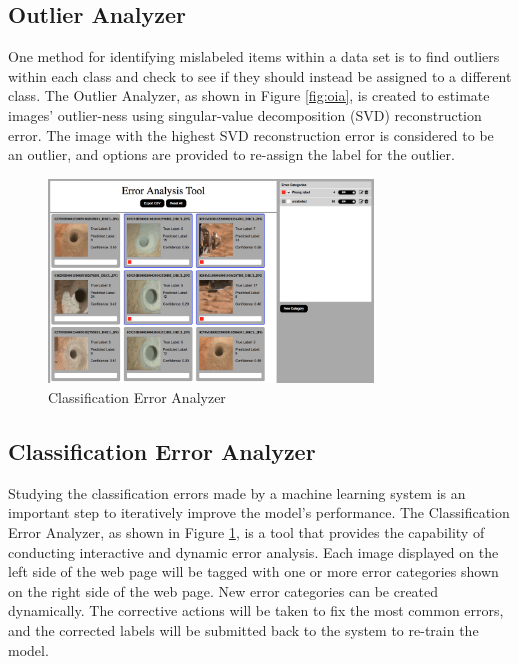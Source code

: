 \subsection{Outlier Analyzer}
One method for identifying mislabeled items within a data set is to find outliers 
within each class and check to see if they should instead be assigned to a 
different class. The Outlier Analyzer, as shown in Figure \ref{fig:oia}, is 
created to estimate images' outlier-ness using singular-value decomposition (SVD) 
reconstruction error. The image with the highest SVD reconstruction error is 
considered to be an outlier, and options are provided to re-assign the label 
for the outlier. 

\begin{figure}
        \centering
        \includegraphics[width=3.4in]{images/eat-ui}
        \caption{Classification Error Analyzer}
        \label{fig:eat}
\end{figure}

\subsection{Classification Error Analyzer}
Studying the classification errors made by a machine learning system is an 
important step to iteratively improve the model's performance. The Classification 
Error Analyzer, as shown in Figure \ref{fig:eat}, is a tool that provides the 
capability of conducting interactive and dynamic error analysis. Each image 
displayed on the left side of the web page will be tagged with one or more error 
categories shown on the right side of the web page. New error categories can be 
created dynamically. The corrective actions will be taken to fix the most common 
errors, and the corrected labels will be submitted back to the system to re-train 
the model.   
